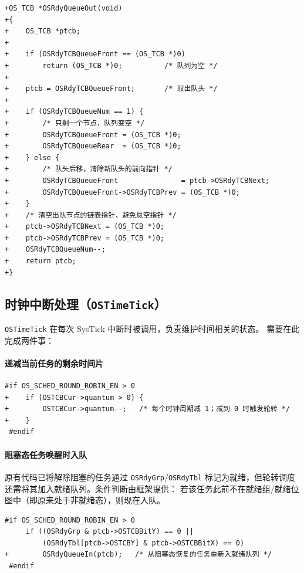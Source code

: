 \documentclass[12pt,a4paper]{article}
\begin{document}
\begin{lstlisting}[style=diffstyle,caption={os\_core.c — 队头出队}]
+OS_TCB *OSRdyQueueOut(void)
+{
+    OS_TCB *ptcb;
+
+    if (OSRdyTCBQueueFront == (OS_TCB *)0)
+        return (OS_TCB *)0;          /* 队列为空 */
+
+    ptcb = OSRdyTCBQueueFront;       /* 取出队头 */
+
+    if (OSRdyTCBQueueNum == 1) {
+        /* 只剩一个节点，队列变空 */
+        OSRdyTCBQueueFront = (OS_TCB *)0;
+        OSRdyTCBQueueRear  = (OS_TCB *)0;
+    } else {
+        /* 队头后移，清除新队头的前向指针 */
+        OSRdyTCBQueueFront               = ptcb->OSRdyTCBNext;
+        OSRdyTCBQueueFront->OSRdyTCBPrev = (OS_TCB *)0;
+    }
+    /* 清空出队节点的链表指针，避免悬空指针 */
+    ptcb->OSRdyTCBNext = (OS_TCB *)0;
+    ptcb->OSRdyTCBPrev = (OS_TCB *)0;
+    OSRdyTCBQueueNum--;
+    return ptcb;
+}
\end{lstlisting}

\subsection{时钟中断处理（\texttt{OSTimeTick}）}

\texttt{OSTimeTick} 在每次 SysTick 中断时被调用，负责维护时间相关的状态。
需要在此完成两件事：

\paragraph{递减当前任务的剩余时间片}

\begin{lstlisting}[style=diffstyle,caption={os\_core.c — 递减当前任务剩余时间片}]
 #if OS_SCHED_ROUND_ROBIN_EN > 0
+    if (OSTCBCur->quantum > 0) {
+        OSTCBCur->quantum--;   /* 每个时钟周期减 1；减到 0 时触发轮转 */
+    }
 #endif
\end{lstlisting}

\paragraph{阻塞态任务唤醒时入队}

原有代码已将解除阻塞的任务通过 \texttt{OSRdyGrp}/\texttt{OSRdyTbl}
标记为就绪，但轮转调度还需将其加入就绪队列。条件判断由框架提供：
若该任务此前不在就绪组/就绪位图中（即原来处于非就绪态），则现在入队。

\begin{lstlisting}[style=diffstyle,caption={os\_core.c — 阻塞转就绪时入队}]
 #if OS_SCHED_ROUND_ROBIN_EN > 0
     if ((OSRdyGrp & ptcb->OSTCBBitY) == 0 ||
         (OSRdyTbl[ptcb->OSTCBY] & ptcb->OSTCBBitX) == 0)
+        OSRdyQueueIn(ptcb);   /* 从阻塞态恢复的任务重新入就绪队列 */
 #endif
\end{lstlisting}
\end{document}
